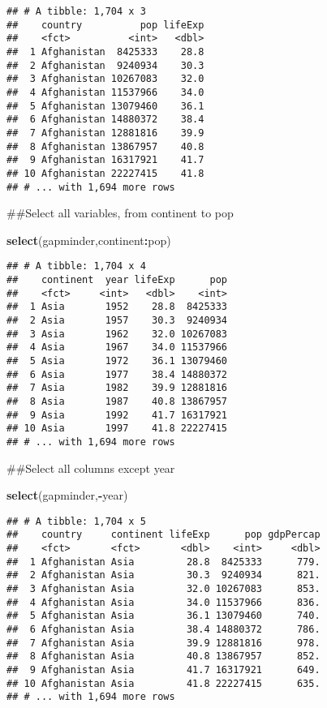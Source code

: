 \documentclass[]{article}
\newenvironment{Shaded}{\begin{snugshade}}{\end{snugshade}}
\newcommand{\KeywordTok}[1]{\textcolor[rgb]{0.13,0.29,0.53}{\textbf{#1}}}
\newcommand{\NormalTok}[1]{#1}
\newcommand{\OperatorTok}[1]{\textcolor[rgb]{0.81,0.36,0.00}{\textbf{#1}}}
\begin{document}
\begin{verbatim}
## # A tibble: 1,704 x 3
##    country          pop lifeExp
##    <fct>          <int>   <dbl>
##  1 Afghanistan  8425333    28.8
##  2 Afghanistan  9240934    30.3
##  3 Afghanistan 10267083    32.0
##  4 Afghanistan 11537966    34.0
##  5 Afghanistan 13079460    36.1
##  6 Afghanistan 14880372    38.4
##  7 Afghanistan 12881816    39.9
##  8 Afghanistan 13867957    40.8
##  9 Afghanistan 16317921    41.7
## 10 Afghanistan 22227415    41.8
## # ... with 1,694 more rows
\end{verbatim}

\begin{Shaded}
\begin{Highlighting}[]
\NormalTok{##Select all variables, from continent to pop}

\KeywordTok{select}\NormalTok{(gapminder,continent}\OperatorTok{:}\NormalTok{pop)}
\end{Highlighting}
\end{Shaded}

\begin{verbatim}
## # A tibble: 1,704 x 4
##    continent  year lifeExp      pop
##    <fct>     <int>   <dbl>    <int>
##  1 Asia       1952    28.8  8425333
##  2 Asia       1957    30.3  9240934
##  3 Asia       1962    32.0 10267083
##  4 Asia       1967    34.0 11537966
##  5 Asia       1972    36.1 13079460
##  6 Asia       1977    38.4 14880372
##  7 Asia       1982    39.9 12881816
##  8 Asia       1987    40.8 13867957
##  9 Asia       1992    41.7 16317921
## 10 Asia       1997    41.8 22227415
## # ... with 1,694 more rows
\end{verbatim}

\begin{Shaded}
\begin{Highlighting}[]
\NormalTok{##Select all columns except year}

\KeywordTok{select}\NormalTok{(gapminder,}\OperatorTok{-}\NormalTok{year)}
\end{Highlighting}
\end{Shaded}

\begin{verbatim}
## # A tibble: 1,704 x 5
##    country     continent lifeExp      pop gdpPercap
##    <fct>       <fct>       <dbl>    <int>     <dbl>
##  1 Afghanistan Asia         28.8  8425333      779.
##  2 Afghanistan Asia         30.3  9240934      821.
##  3 Afghanistan Asia         32.0 10267083      853.
##  4 Afghanistan Asia         34.0 11537966      836.
##  5 Afghanistan Asia         36.1 13079460      740.
##  6 Afghanistan Asia         38.4 14880372      786.
##  7 Afghanistan Asia         39.9 12881816      978.
##  8 Afghanistan Asia         40.8 13867957      852.
##  9 Afghanistan Asia         41.7 16317921      649.
## 10 Afghanistan Asia         41.8 22227415      635.
## # ... with 1,694 more rows
\end{verbatim}
\end{document}
